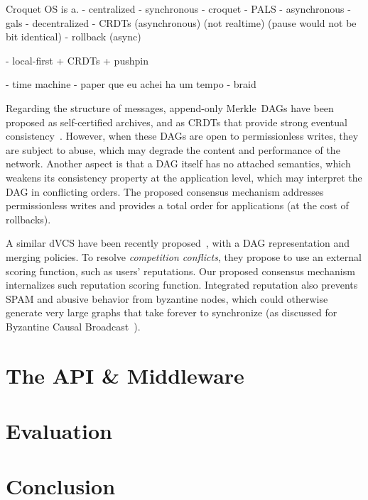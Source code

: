 \documentclass[10pt,journal,compsoc]{IEEEtran}
\begin{document}
Croquet OS is a.
- centralized
    - synchronous
        - croquet
	- PALS
    - asynchronous
        - gals
- decentralized
    - CRDTs (asynchronous) (not realtime) (pause would not be bit identical)
    - rollback (async)

- local-first + CRDTs + pushpin

- time machine
    - paper que eu achei ha um tempo
    - braid

Regarding the structure of messages, append-only Merkle~DAGs have been proposed
as self-certified archives, and as CRDTs that provide strong eventual
consistency~\cite{fed.matrix,p2p.byz}.
However, when these DAGs are open to permissionless writes, they are subject to
abuse, which may degrade the content and performance of the network.
Another aspect is that a DAG itself has no attached semantics, which weakens
its consistency property at the application level, which may interpret the DAG
in conflicting orders.
The proposed consensus mechanism addresses permissionless writes and provides
a total order for applications (at the cost of rollbacks).

A similar dVCS have been recently proposed~\cite{p2p.dvcs}, with a DAG
representation and merging policies.
To resolve \emph{competition conflicts}, they propose to use an external
scoring function, such as users' reputations.
Our proposed consensus mechanism internalizes such reputation scoring function.
Integrated reputation also prevents SPAM and abusive behavior from byzantine
nodes, which could otherwise generate very large graphs that take forever to
synchronize (as discussed for Byzantine Causal Broadcast~\cite{p2p.dag.sync}).

\section{The API \& Middleware}
\label{sec.conclusion}

\section{Evaluation}
\label{sec.conclusion}

\section{Conclusion}
\label{sec.conclusion}



\end{document}
